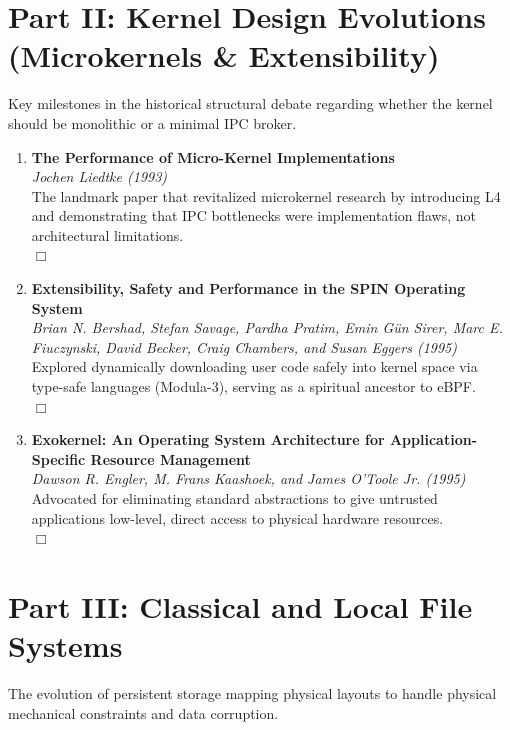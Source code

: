 \documentclass[11pt,a4paper]{article}
\begin{document}
\section{Part II: Kernel Design Evolutions (Microkernels \& Extensibility)}
Key milestones in the historical structural debate regarding whether the kernel should be monolithic or a minimal IPC broker.

\begin{enumerate}[resume]
    \item \textbf{The Performance of Micro-Kernel Implementations} \\
    \textit{Jochen Liedtke (1993)} \\
    The landmark paper that revitalized microkernel research by introducing L4 and demonstrating that IPC bottlenecks were implementation flaws, not architectural limitations. \\
    $\Box$
    
    \item \textbf{Extensibility, Safety and Performance in the SPIN Operating System} \\
    \textit{Brian N. Bershad, Stefan Savage, Pardha Pratim, Emin G\"{u}n Sirer, Marc E. Fiuczynski, David Becker, Craig Chambers, and Susan Eggers (1995)} \\
    Explored dynamically downloading user code safely into kernel space via type-safe languages (Modula-3), serving as a spiritual ancestor to eBPF. \\
    $\Box$
    
    \item \textbf{Exokernel: An Operating System Architecture for Application-Specific Resource Management} \\
    \textit{Dawson R. Engler, M. Frans Kaashoek, and James O'Toole Jr. (1995)} \\
    Advocated for eliminating standard abstractions to give untrusted applications low-level, direct access to physical hardware resources. \\
    $\Box$
\end{enumerate}

\section{Part III: Classical and Local File Systems}
The evolution of persistent storage mapping physical layouts to handle physical mechanical constraints and data corruption.
\end{document}
